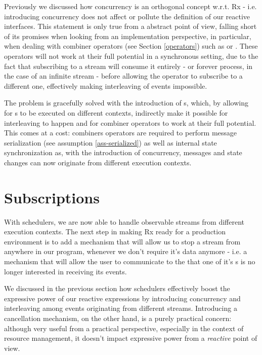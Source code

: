 Previously we discussed how concurrency is an orthogonal concept w.r.t. Rx - i.e. introducing concurrency does not affect or pollute the definition of our reactive interfaces. This statement is only true from a abstract point of view, falling short of its promises when looking from an implementation perspective, in particular, when dealing with combiner operators (see Section \ref{operators}) such as \code{(>>=)} or . These operators will not work at their full potential in a synchronous setting, due to the fact that subscribing to a stream will consume it entirely - or forever process, in the case of an infinite stream - before allowing the operator to subscribe to a different one, effectively making interleaving of events impossible. 

The problem is gracefully solved with the introduction of s, which, by allowing for s to be executed on different contexts, indirectly make it possible for interleaving to happen and for combiner operators to work at their full potential. This comes at a cost: combiners operators are required to perform message serialization (see assumption \ref{ass-serialized}) as well as internal state synchronization as, with the introduction of concurrency, messages and state changes can now originate from different execution contexts.

\section{Subscriptions}
\label{sec:subscriptions}

With schedulers, we are now able to handle observable streams from different execution contexts. The next step in making Rx ready for a production environment is to add a mechanism that will allow us to stop a stream from anywhere in our program, whenever we don't require it's data anymore - i.e. a mechanism that will allow the user to communicate to the  that one of it's s is no longer interested in receiving its events. 

We discussed in the previous section how schedulers effectively boost the expressive power of our reactive expressions by introducing concurrency and interleaving among events originating from different streams. Introducing a cancellation mechanism, on the other hand, is a purely practical concern: although very useful from a practical perspective, especially in the context of resource management, it doesn't impact expressive power from a \textit{reactive} point of view.

